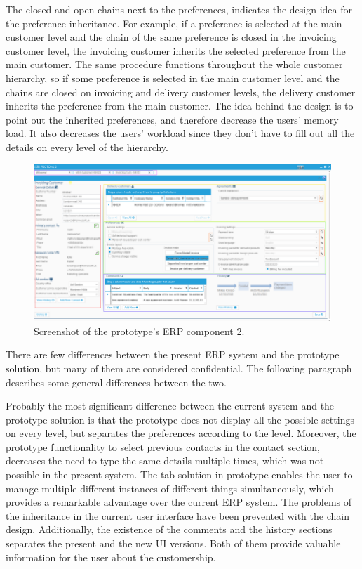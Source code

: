 \documentclass[12pt,a4paper,oneside,pdftex]{report}
\begin{document}
The closed and open chains next to the preferences, indicates the design idea for the preference inheritance. For example, if a preference is selected at the main customer level and the chain of the same preference is closed in the invoicing customer level, the invoicing customer inherits the selected preference from the main customer. The same procedure functions throughout the whole customer hierarchy, so if some preference is selected in the main customer level and the chains are closed on invoicing and delivery customer levels, the delivery customer inherits the preference from the main customer. The idea behind the design is to point out the inherited preferences, and therefore decrease the users' memory load. It also decreases the users' workload since they don't have to fill out all the details on every level of the hierarchy.   

\begin{figure}[H]
  	\centerline{
    	   \includegraphics[width=1.3\textwidth]{./images/proto_invoicing.png}
    	   }
  	   \caption{Screenshot of  the prototype's ERP component 2.}
	   \label{fig:prototwoimg}
\end{figure}

There are few differences between the present ERP system and the prototype solution, but many of them are considered confidential. The following paragraph describes some general differences between the two.

Probably the most significant difference between the current system and the prototype solution is that the prototype does not display all the possible settings on every level, but separates the preferences according to the level. Moreover, the prototype functionality to select previous contacts in the contact section, decreases the need to type the same details multiple times, which was not possible in the present system. The tab solution in prototype enables the user to manage multiple different instances of different things simultaneously, which provides a remarkable advantage over the current ERP system. The problems of the inheritance in the current user interface have been prevented with the chain design. Additionally, the existence of the comments and the history sections separates the present and the new UI versions. Both of them provide valuable information for the user about the customership.
\end{document}
